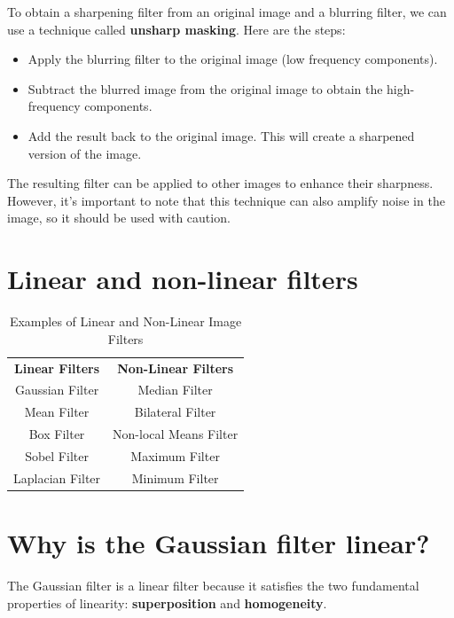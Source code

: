 \documentclass{article}
\begin{document}
To obtain a sharpening filter from an original image and a blurring filter, we can use a technique called \textbf{unsharp masking}. 
Here are the steps:

\begin{itemize}
    \item Apply the blurring filter to the original image (low frequency components).
    \item Subtract the blurred image from the original image to obtain the high-frequency components.
    \item Add the result back to the original image. This will create a sharpened version of the image.
\end{itemize}

The resulting filter can be applied to other images to enhance their sharpness. However, it's important to note that this technique can also amplify noise in the image, so it should be used with caution.

\section*{Linear and non-linear filters}

\begin{table}[h!]
\centering
\begin{tabular}{c|c}

\textbf{Linear Filters} & \textbf{Non-Linear Filters} \\
Gaussian Filter & Median Filter \\
Mean Filter & Bilateral Filter \\
Box Filter & Non-local Means Filter \\
Sobel Filter & Maximum Filter \\
Laplacian Filter & Minimum Filter \\
\end{tabular}
\caption{Examples of Linear and Non-Linear Image Filters}
\label{tab:filters}
\end{table}

\newpage

\section*{Why is the Gaussian filter linear?}

The Gaussian filter is a linear filter because it satisfies the two fundamental properties of linearity: \textbf{superposition} and \textbf{homogeneity}.\
\end{document}
